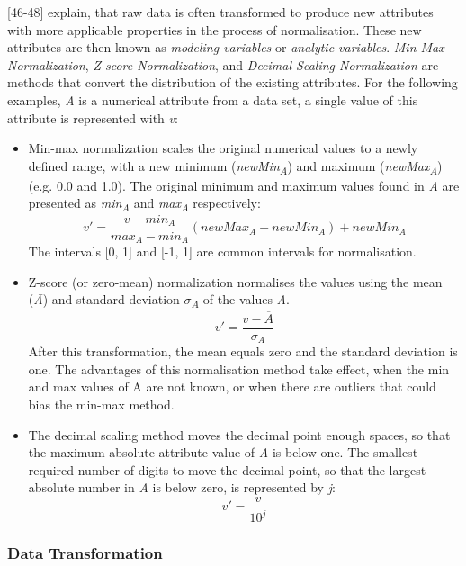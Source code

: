 \textcite{dataPreprocessingInDataMining}[46-48] explain, that raw data is often transformed to produce new attributes with more applicable properties in the process of normalisation. These new attributes are then known as \textit{modeling variables} or \textit{analytic variables}. 
\textit{Min-Max Normalization}, \textit{Z-score Normalization}, and \textit{Decimal Scaling Normalization} are methods that convert the distribution of the existing attributes. For the following examples, \textit{A} is a numerical attribute from a data set, a single value of this attribute is represented with \textit{v}:
\begin{itemize}
  \item Min-max normalization scales the original numerical values to a newly defined range, with a new minimum (\textit{newMin\textsubscript{A}}) and maximum (\textit{newMax\textsubscript{A}}) (e.g. 0.0 and 1.0). The original minimum and maximum values found in \textit{A} are presented as \textit{min\textsubscript{A}} and \textit{max\textsubscript{A}} respectively:
  \[
    v' = \frac{v - min_A}{max_A - min_A}(newMax_A - newMin_A) + newMin_A
  \]
  The intervals [0, 1] and [-1, 1] are common intervals for normalisation. 

  \item Z-score (or zero-mean) normalization normalises the values using the mean (\textit{\={A}}) and standard deviation \textit{$\sigma$\textsubscript{A}} of the values \textit{A}.
  \[
    v' = \frac{v - \overline{A}}{\sigma_A}
  \]
  After this transformation, the mean equals zero and the standard deviation is one. The advantages of this normalisation method take effect, when the min and max values of A are not known, or when there are outliers that could bias the min-max method.

  \item The decimal scaling method moves the decimal point enough spaces, so that the maximum absolute attribute value of \textit{A} is below one. The smallest required number of digits to move the decimal point, so that the largest absolute number in \textit{A} is below zero, is represented by \textit{j}:
  \[
    v' = \frac{v}{10^j}
  \]
\end{itemize}



\subsubsection{Data Transformation}
\label{section:Transformation}

